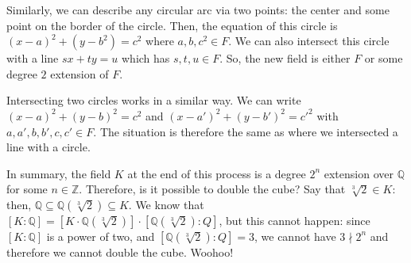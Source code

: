 \documentclass{article}
\theoremstyle{plain}
\newcommand{\Q}{\mathbb{Q}}
\newcommand{\Z}{\mathbb{Z}}
\begin{document}
Similarly, we can describe any circular arc via two points: the center and some point on the border of the circle. Then, the equation of this circle is $(x-a)^2 + (y-b^2) = c^2$ where $a,b,c^2 \in F$. We can also intersect this circle with a line $sx + ty = u$ which has $s,t,u \in F$. So, the new field is either $F$ or some degree $2$ extension of $F$.

Intersecting two circles works in a similar way. We can write $(x-a)^2 + (y-b)^2 = c^2$ and $(x-a')^2 + (y-b')^2 = c'^2$ with $a,a',b,b',c,c' \in F$. The situation is therefore the same as where we intersected a line with a circle.

In summary, the field $K$ at the end of this process is a degree $2^n$ extension over $\Q$ for some $n\in\Z$. Therefore, is it possible to double the cube? Say that $\sqrt[3]{2} \in K$: then, $\Q \subseteq \Q(\sqrt[3]{2}) \subseteq K$. We know that $[K:\Q] = [K \cdot \Q(\sqrt[3]{2})]\cdot[\Q(\sqrt[3]{2}) : Q]$, but this cannot happen: since $[K:\Q]$ is a power of two, and $[\Q(\sqrt[3]{2}) : Q] = 3$, we cannot have $3\nmid 2^n$ and therefore we cannot double the cube. Woohoo!
\end{document}
